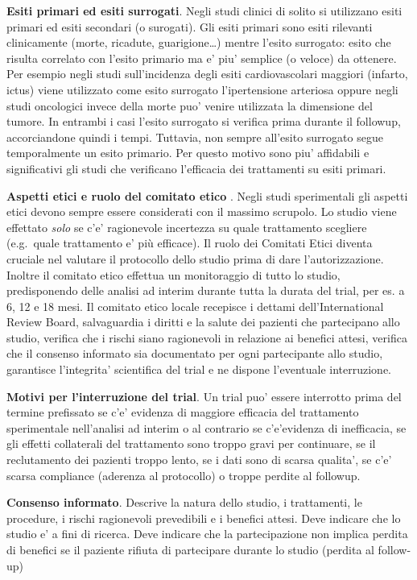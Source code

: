 \documentclass[]{book}
\begin{document}
\textbf{Esiti primari ed esiti surrogati}.
Negli studi clinici di solito si utilizzano esiti primari ed esiti secondari (o surogati). Gli esiti primari sono esiti rilevanti clinicamente (morte, ricadute, guarigione\ldots{}) mentre l'esito surrogato: esito che risulta correlato con l'esito primario ma e' piu' semplice (o veloce) da ottenere. Per esempio negli studi sull'incidenza degli esiti cardiovascolari maggiori (infarto, ictus) viene utilizzato come esito surrogato l'ipertensione arteriosa oppure negli studi oncologici invece della morte puo' venire utilizzata la dimensione del tumore. In entrambi i casi l'esito surrogato si verifica prima durante il followup, accorciandone quindi i tempi. Tuttavia, non sempre all'esito surrogato segue temporalmente un esito primario. Per questo motivo sono piu' affidabili e significativi gli studi che verificano l'efficacia dei trattamenti su esiti primari.

\textbf{Aspetti etici e ruolo del comitato etico }. Negli studi sperimentali gli aspetti etici devono sempre essere considerati con il massimo scrupolo. Lo studio viene effettato \emph{solo} se c'e' ragionevole incertezza su quale trattamento scegliere (e.g.~quale trattamento e' più efficace). Il ruolo dei Comitati Etici diventa cruciale nel valutare il protocollo dello studio prima di dare l'autorizzazione. Inoltre il comitato etico effettua un monitoraggio di tutto lo studio, predisponendo delle analisi ad interim durante tutta la durata del trial, per es. a 6, 12 e 18 mesi. Il comitato etico locale recepisce i dettami dell'International Review Board, salvaguardia i diritti e la salute dei pazienti che partecipano allo studio, verifica che i rischi siano ragionevoli in relazione ai benefici attesi, verifica che il consenso informato sia documentato per ogni partecipante allo studio, garantisce l'integrita' scientifica del trial e ne dispone l'eventuale interruzione.

\textbf{Motivi per l'interruzione del trial}. Un trial puo' essere interrotto prima del termine prefissato se c'e' evidenza di maggiore efficacia del trattamento sperimentale nell'analisi ad interim o al contrario se c'e'evidenza di inefficacia, se gli effetti collaterali del trattamento sono troppo gravi per continuare, se il reclutamento dei pazienti troppo lento, se i dati sono di scarsa qualita', se c'e' scarsa compliance (aderenza al protocollo) o troppe perdite al followup.

\textbf{Consenso informato}. Descrive la natura dello studio, i trattamenti, le procedure, i rischi ragionevoli
prevedibili e i benefici attesi. Deve indicare che lo studio e' a fini di ricerca. Deve indicare che la partecipazione non implica perdita di benefici se il paziente rifiuta di partecipare durante lo studio (perdita al follow-up)
\end{document}
